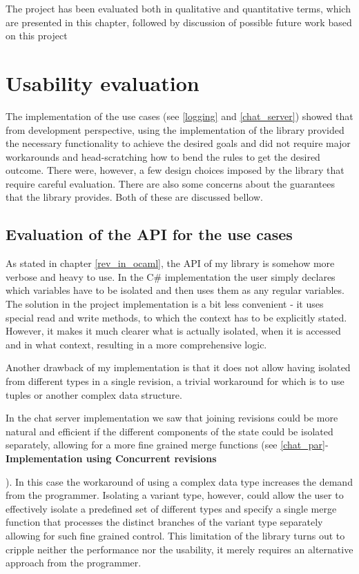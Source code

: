 \documentclass[12pt,twoside,notitlepage]{report}
\begin{document}
{The project has been evaluated both in qualitative and quantitative terms, which are presented in this chapter, followed by discussion of possible future work based on this project

\section{Usability evaluation}
The implementation of the use cases (see \ref{logging} and \ref{chat_server}) showed that from development perspective, using the implementation of the library provided the necessary functionality to achieve the desired goals and did not require major workarounds and head-scratching how to bend the rules to get the desired outcome. There were, however, a few design choices imposed by the library that require careful evaluation. There are also some concerns about the guarantees that the library provides. Both of these are discussed bellow.

\subsection{Evaluation of the API for the use cases}
\label{eval_api}
As stated in chapter \ref{rev_in_ocaml}, the API of my library is somehow more verbose and heavy to use. In the C\# implementation the user simply declares which variables have to be isolated and then uses them as any regular variables. The solution in the project implementation is a bit less convenient - it uses special read and write methods, to which the context has to be explicitly stated. However, it makes it much clearer what is actually isolated, when it is accessed and in what context, resulting in a more comprehensive logic.  

Another drawback of my implementation is that it does not allow having isolated from different types in a single revision, a trivial workaround for which is to use tuples or another complex data structure. 

In the chat server implementation we saw that joining revisions could be more natural and efficient if the different components of the state could be isolated separately, allowing for a more fine grained merge functions (see \ref{chat_par}-\bfseries{Implementation using Concurrent revisions}}). In this case the workaround of using a complex data type increases the demand from the programmer. Isolating a variant type, however, could allow the user to effectively isolate a predefined set of different types and specify a single merge function that processes the distinct branches of the variant type separately allowing for such fine grained control. This limitation of the library turns out to cripple neither the performance nor the usability, it merely requires an alternative approach from the programmer.  
\end{document}
